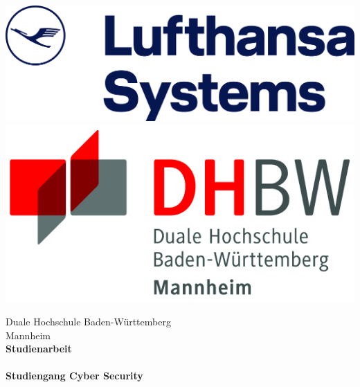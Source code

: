 \begin{titlepage}
    \begin{minipage}{\textwidth}
            \vspace{-2cm}
            \noindent
            \includegraphics[scale=0.035]{img/Uzletiforditas.hu-Lufthansa.png} 
             \hfill   
             \includegraphics{img/logo.jpg}
    \end{minipage}
    
    \vspace{1em}
    \sffamily
    \begin{center}
        \textsf{\large{}Duale Hochschule Baden-W\"urttemberg\\[1.5mm] Mannheim}\\[2em]
        \textsf{\textbf{\Large{}Studienarbeit}}\\[3mm]
        \textsf{\textbf{\DerTitelDerArbeit}} \\[1.5cm]
        \textsf{\textbf{\Large{}Studiengang Cyber Security}\\[3mm]}
        
        \vspace{3em}
    \vfill
    
    \begin{minipage}{\textwidth}
    

\end{minipage}
\end{center}
\end{titlepage}
